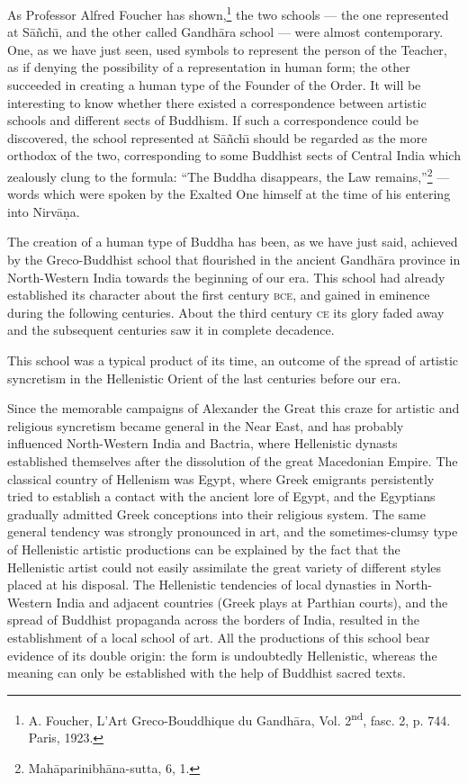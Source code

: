 \documentclass[a4paper, 12pt, oneside]{article}
\begin{document}
As Professor Alfred Foucher has shown,\footnote{A. Foucher, L'Art Greco-Bouddhique du Gandh\={a}ra, Vol. 2\textsuperscript{nd}, fasc. 2, p. 744. Paris, 1923.} the two schools --- the one represented at S\={a}\~{n}ch\={\i}, and the other called Gandh\={a}ra school --- were almost contemporary. One, as we have just seen, used symbols to represent the person of the Teacher, as if denying the possibility of a representation in human form; the other succeeded in creating a human type of the Founder of the Order. It will be interesting to know whether there existed a correspondence between artistic schools and different sects of Buddhism. If such a correspondence could be discovered, the school represented at S\={a}\~{n}ch\={\i} should be regarded as the more orthodox of the two, corresponding to some Buddhist sects of Central India which zealously clung to the formula: ``The Buddha disappears, the Law remains,''\footnote{Mah\={a}parinibh\={a}na-sutta, 6, 1.} --- words which were spoken by the Exalted One himself at the time of his entering into Nirv\={a}\d{n}a.

The creation of a human type of Buddha has been, as we have just said, achieved by the Greco-Buddhist school that flourished in the ancient Gandh\={a}ra province in North-Western India towards the beginning of our era. This school had already established its character about the first century \textsc{bce}, and gained in eminence during the following centuries. About the third century \textsc{ce} its glory faded away and the subsequent centuries saw it in complete decadence.

This school was a typical product of its time, an outcome of the spread of artistic syncretism in the Hellenistic Orient of the last centuries before our era.

Since the memorable campaigns of Alexander the Great this craze for artistic and religious syncretism became general in the Near East, and has probably influenced North-Western India and Bactria, where Hellenistic dynasts established themselves after the dissolution of the great Macedonian Empire. The classical country of Hellenism was Egypt, where Greek emigrants persistently tried to establish a contact with the ancient lore of Egypt, and the Egyptians gradually admitted Greek conceptions into their religious system. The same general tendency was strongly pronounced in art, and the sometimes-clumsy type of Hellenistic artistic productions can be explained by the fact that the Hellenistic artist could not easily assimilate the great variety of different styles placed at his disposal. The Hellenistic tendencies of local dynasties in North-Western India and adjacent countries (Greek plays at Parthian courts), and the spread of Buddhist propaganda across the borders of India, resulted in the establishment of a local school of art. All the productions of this school bear evidence of its double origin: the form is undoubtedly Hellenistic, whereas the meaning can only be established with the help of Buddhist sacred texts.
\end{document}
